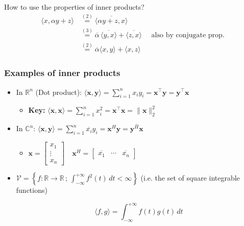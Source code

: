 \begin{example} How to use the properties of inner products?
    \begin{align*}
        \langle x, \alpha y + z \rangle &\overset{(2)}= \overline{\langle \alpha y + z, x \rangle} \\
        &\overset{(3)}{=} \overline{\alpha} \, \overline{\langle y, x \rangle} + \overline{\langle z, x \rangle} \quad \text{ also by conjugate prop.}\\
        &\overset{(2)}{=} \overline{\alpha} \langle x, y \rangle + \langle x, z \rangle
    \end{align*}
\end{example}

\subsubsection{Examples of inner products}
\begin{example}
    \begin{itemize}
        \item In \( \mathbb{R}^n \) (Dot product): $\langle \mathbf{x}, \mathbf{y} \rangle = \sum_{i=1}^{n} x_i y_i = \mathbf{x}^\top \mathbf{y}=\mathbf{y}^\top \mathbf{x}$
        \begin{itemize}
            \item \textbf{Key:} $\langle \mathbf{x}, \mathbf{x} \rangle = \sum_{i=1}^{n} x_i^2 = \mathbf{x}^\top \mathbf{x} = \lVert \mathbf{x} \rVert_2^2$ 
        \end{itemize}
        \item In \( \mathbb{C}^n \): $\langle \mathbf{x}, \mathbf{y} \rangle = \sum_{i=1}^{n} \overline{x_i} y_i = \mathbf{x}^H \mathbf{y} = \overline{\mathbf{y}^H \mathbf{x}}$
        \begin{itemize}
            \item $
                \mathbf{x} = \begin{bmatrix}
                x_1 \\
                \vdots \\
                x_n
                \end{bmatrix}
                \quad
                \mathbf{x}^H = \begin{bmatrix}
                \overline{x_1} & \cdots & \overline{x_n}
                \end{bmatrix}
                $
        \end{itemize}
        \item $\mathcal{V} = \left\{ f : \mathbb{R} \to \mathbb{R} \, ; \, \int_{-\infty}^{+\infty} f^2(t) \, dt < \infty \right\}$ (i.e. the set of square integrable functions)

        \[
        \langle f, g \rangle = \int_{-\infty}^{+\infty} f(t) g(t) \, dt
        \]

    \end{itemize}
\end{example}

